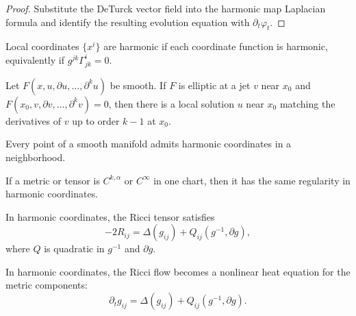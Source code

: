 \begin{proof}
\sketch Substitute the DeTurck vector field into the harmonic map Laplacian formula and identify the resulting evolution equation with \(\partial_t\varphi_t\).
\end{proof}

\begin{definition}
\label{ch03-def-harmonic-coordinates}
Local coordinates \(\{x^i\}\) are harmonic if each coordinate function is harmonic, equivalently if \(g^{jk}\Gamma^i_{jk}=0\).
\end{definition}

\begin{theorem}
\label{ch03-thm-local-elliptic-solvability}
Let \(F(x,u,\partial u,\ldots,\partial^ku)\) be smooth. If \(F\) is elliptic at a jet \(v\) near \(x_0\) and \(F(x_0,v,\partial v,\ldots,\partial^kv)=0\), then there is a local solution \(u\) near \(x_0\) matching the derivatives of \(v\) up to order \(k-1\) at \(x_0\).
\end{theorem}

\begin{corollary}
\label{ch03-cor-harmonic-coordinates-exist}
Every point of a smooth manifold admits harmonic coordinates in a neighborhood.
\end{corollary}

\begin{lemma}
\label{ch03-lem-harmonic-coordinate-regularity}
If a metric or tensor is \(C^{k,\alpha}\) or \(C^\infty\) in one chart, then it has the same regularity in harmonic coordinates.
\end{lemma}

\begin{lemma}
\label{ch03-lem-ricci-in-harmonic-coordinates}
In harmonic coordinates, the Ricci tensor satisfies
\[
-2R_{ij}=\Delta(g_{ij})+Q_{ij}(g^{-1},\partial g),
\]
where \(Q\) is quadratic in \(g^{-1}\) and \(\partial g\).
\end{lemma}

\begin{corollary}
\label{ch03-cor-ricci-flow-heat-equation}
In harmonic coordinates, the Ricci flow becomes a nonlinear heat equation for the metric components:
\[
\partial_t g_{ij}=\Delta(g_{ij})+Q_{ij}(g^{-1},\partial g).
\]
\end{corollary}

